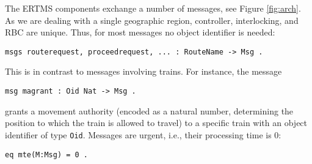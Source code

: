 The ERTMS components exchange a number of messages, see Figure
\ref{fig:arch}. As we are dealing with a single geographic region,
controller, interlocking, and RBC are unique. Thus, for most messages
no object identifier is needed:
%
\begin{lstlisting}[columns=fixed]
msgs routerequest, proceedrequest, ... : RouteName -> Msg .
\end{lstlisting}
This is in contrast to messages involving trains. For instance, the message 
\begin{lstlisting}[columns=fixed]
msg magrant : Oid Nat -> Msg .
\end{lstlisting}
grants a movement authority (encoded as a natural number, determining
the position to which the train is allowed to travel) to a specific
train with an object identifier of type \verb|Oid|.
%
Messages are urgent, i.e., their processing time is 0:
\begin{lstlisting}[columns=fixed]
eq mte(M:Msg) = 0 .
\end{lstlisting}
